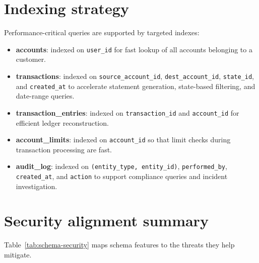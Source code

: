 \section{Indexing strategy}

Performance-critical queries are supported by targeted indexes:

\begin{itemize}
  \item \textbf{accounts}: indexed on \texttt{user\_id} for fast lookup of all accounts belonging to a customer.
  \item \textbf{transactions}: indexed on \texttt{source\_account\_id}, \texttt{dest\_account\_id}, \texttt{state\_id}, and \texttt{created\_at} to accelerate statement generation, state-based filtering, and date-range queries.
  \item \textbf{transaction\_entries}: indexed on \texttt{transaction\_id} and \texttt{account\_id} for efficient ledger reconstruction.
  \item \textbf{account\_limits}: indexed on \texttt{account\_id} so that limit checks during transaction processing are fast.
  \item \textbf{audit\_log}: indexed on \texttt{(entity\_type, entity\_id)}, \texttt{performed\_by}, \texttt{created\_at}, and \texttt{action} to support compliance queries and incident investigation.
\end{itemize}

\section{Security alignment summary}

Table~\ref{tab:schema-security} maps schema features to the threats they help mitigate.

